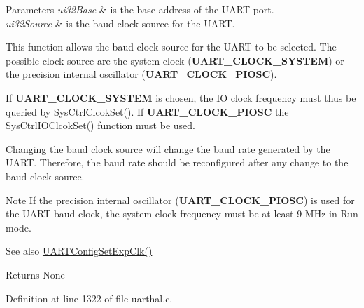 \begin{DoxyParams}{Parameters}
{\em ui32\+Base} & is the base address of the U\+A\+RT port. \\
\hline
{\em ui32\+Source} & is the baud clock source for the U\+A\+RT.\\
\hline
\end{DoxyParams}
This function allows the baud clock source for the U\+A\+RT to be selected. The possible clock source are the system clock ({\bfseries U\+A\+R\+T\+\_\+\+C\+L\+O\+C\+K\+\_\+\+S\+Y\+S\+T\+EM}) or the precision internal oscillator ({\bfseries U\+A\+R\+T\+\_\+\+C\+L\+O\+C\+K\+\_\+\+P\+I\+O\+SC}).

If {\bfseries U\+A\+R\+T\+\_\+\+C\+L\+O\+C\+K\+\_\+\+S\+Y\+S\+T\+EM} is chosen, the IO clock frequency must thus be queried by Sys\+Ctrl\+Clcok\+Set(). If {\bfseries U\+A\+R\+T\+\_\+\+C\+L\+O\+C\+K\+\_\+\+P\+I\+O\+SC} the Sys\+Ctrl\+I\+O\+Clcok\+Set() function must be used.

Changing the baud clock source will change the baud rate generated by the U\+A\+RT. Therefore, the baud rate should be reconfigured after any change to the baud clock source.

\begin{DoxyNote}{Note}
If the precision internal oscillator ({\bfseries U\+A\+R\+T\+\_\+\+C\+L\+O\+C\+K\+\_\+\+P\+I\+O\+SC}) is used for the U\+A\+RT baud clock, the system clock frequency must be at least 9 M\+Hz in Run mode.
\end{DoxyNote}
\begin{DoxySeeAlso}{See also}
\hyperlink{group__uart__api_gaacfccbb6fb7e3e3138573bfc4835250b}{U\+A\+R\+T\+Config\+Set\+Exp\+Clk()}
\end{DoxySeeAlso}
\begin{DoxyReturn}{Returns}
None 
\end{DoxyReturn}


Definition at line 1322 of file uarthal.\+c.

